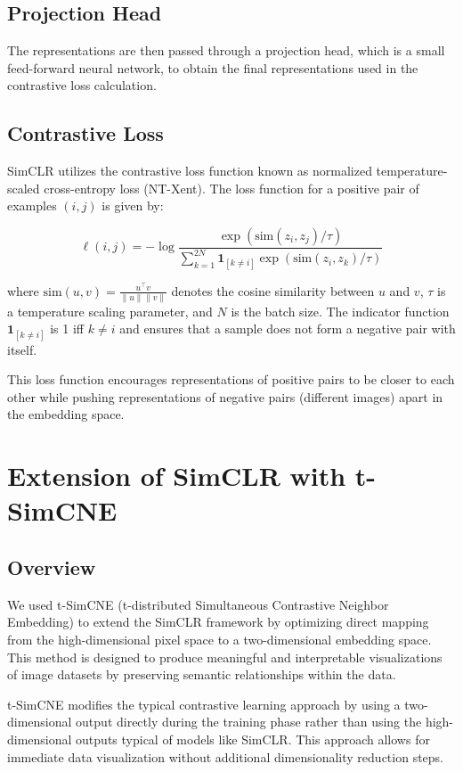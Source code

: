 \subsection{Projection Head}
The representations are then passed through a projection head, which is a small feed-forward neural network, to obtain the final representations used in the contrastive loss calculation.

\subsection{Contrastive Loss}
SimCLR utilizes the contrastive loss function known as normalized temperature-scaled cross-entropy loss (NT-Xent). The loss function for a positive pair of examples $(i, j)$ is given by:

\begin{equation}
\ell(i, j) = -\log \frac{\exp(\text{sim}(z_i, z_j) / \tau)}{\sum_{k=1}^{2N} \mathbf{1}_{[k \neq i]} \exp(\text{sim}(z_i, z_k) / \tau)}
\end{equation}

where $\text{sim}(u, v) = \frac{u^\top v}{\|u\| \|v\|}$ denotes the cosine similarity between $u$ and $v$, $\tau$ is a temperature scaling parameter, and $N$ is the batch size. The indicator function $\mathbf{1}_{[k \neq i]}$ is 1 iff $k \neq i$ and ensures that a sample does not form a negative pair with itself.

This loss function encourages representations of positive pairs to be closer to each other while pushing representations of negative pairs (different images) apart in the embedding space.

\section{Extension of SimCLR with t-SimCNE}
\subsection{Overview}
We used t-SimCNE (t-distributed Simultaneous Contrastive Neighbor Embedding) to extend the SimCLR framework by optimizing direct mapping from the high-dimensional pixel space to a two-dimensional embedding space. This method is designed to produce meaningful and interpretable visualizations of image datasets by preserving semantic relationships within the data.

t-SimCNE modifies the typical contrastive learning approach by using a two-dimensional output directly during the training phase rather than using the high-dimensional outputs typical of models like SimCLR. This approach allows for immediate data visualization without additional dimensionality reduction steps.

